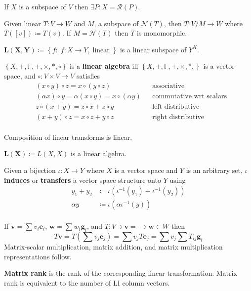 \documentclass[letterpaper,11pt]{amsart}
\newcommand{\keyphrase}[1]{\textbf{#1}}
\DeclareMathOperator{\linear}{linear}
\begin{document}
If $X$ is a subspace of $V$ then $\exists{}P : X=\mathcal{R}(P)$.

Given linear $T:V \to W$ and $M$, a subspace of $\mathcal{N}(T)$, then
$\bar{T}:V/M \to W$ where $\bar{T}(\left[ v \right]) \coloneqq T(v)$.
If $M=\mathcal{N}(T)$ then $\bar{T}$ is monomorphic.

$\boldsymbol{L(X,Y)}\coloneqq{}\left\{f:\;f:X\to{}Y,\linear\right\}$
is a linear subspace of $Y^{X}$.

$\left\{X, +, \mathbb{F}, +, \times, \ast, \circ \right\}$ is a
\keyphrase{linear algebra} iff
$\left\{X, +, \mathbb{F}, +, \times, \ast, \right\}$ is a vector
space, and
$\circ:V\times{}V\to{}V$ satisfies
\begin{align*}
    & (x \circ y) \circ z = x \circ (y \circ z)
    & &\text{associative}\\
    & (\alpha x) \circ y = \alpha (x \circ y) = x \circ (\alpha y)
    & &\text{commutative wrt scalars} \\
    & z \circ (x+y) = z \circ x + z \circ y
    & &\text{left distributive}\\
    & (x+y) \circ z = x \circ z + y \circ z
    & &\text{right distributive}\\
\end{align*}

Composition of linear transforms is linear.

$\boldsymbol{L(X)} \coloneqq L(X,X)$ is a linear algebra.

Given a bijection $\iota:X \to Y$ where $X$ is a vector space and $Y$ is
an arbitrary set, $\iota$ \keyphrase{induces} or \keyphrase{transfers} a
vector space structure onto $Y$ using
\begin{align*}
    y_{1} + y_{2} &\coloneqq \iota\left(
        \iota^{-1}\left( y_{1} \right) + \iota^{-1}\left( y_{2} \right)
    \right) \\
    \alpha y
    &\coloneqq \iota\left( \alpha \iota^{-1}\left( y \right) \right) \\
\end{align*}


If
$\mathbf{v}=\sum v_{i} \mathbf{e}_{i}$,
$\mathbf{w}=\sum w_{i} \mathbf{g}_{i}$,
and
$T : V \ni{} \mathbf{v}= \to{} \mathbf{w} \in{}W$ then
\[
    T\mathbf{v}
    = T\left( \sum v_{j} \mathbf{e}_{j} \right)
    = \sum v_{j} T \mathbf{e}_{j}
    = \sum v_{j} \sum T_{ij} \mathbf{g}_{i}
\]
Matrix-scalar multiplication, matrix addition, and matrix multiplication
representations follow.

\keyphrase{Matrix rank} is the rank of the corresponding linear transformation.
Matrix rank is equivalent to the number of LI column vectors.
\end{document}
